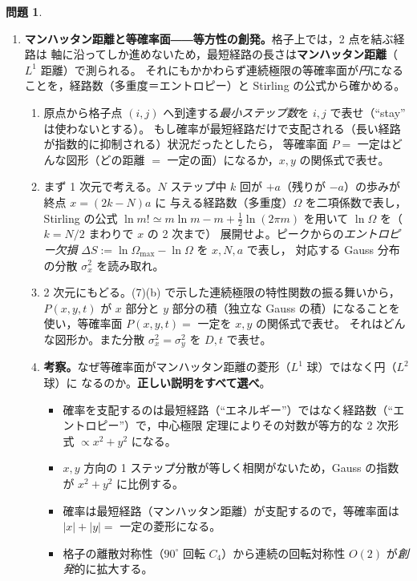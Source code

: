 \documentclass[dvipdfmx, uplatex]{jsarticle}
\theoremstyle{definition}
\newtheorem*{prob}{問題}
\begin{document}
\begin{prob}
\begin{enumerate}[start=8]
\item \textbf{マンハッタン距離と等確率面――等方性の創発。}格子上では，2 点を結ぶ経路は
軸に沿ってしか進めないため，最短経路の長さは\textbf{マンハッタン距離}（$L^1$ 距離）で測られる。
それにもかかわらず連続極限の等確率面が\emph{円}になることを，経路数（多重度＝エントロピー）と
Stirling の公式から確かめる。
\begin{enumerate}
\item 原点から格子点 $(i,j)$ へ到達する\emph{最小ステップ数}を $i,j$ で表せ（``stay'' は使わないとする）。
もし確率が最短経路だけで支配される（長い経路が指数的に抑制される）状況だったとしたら，
等確率面 $P=$ 一定はどんな図形（どの距離 $=$ 一定の面）になるか，$x,y$ の関係式で表せ。
\item まず 1 次元で考える。$N$ ステップ中 $k$ 回が $+a$（残りが $-a$）の歩みが終点 $x=(2k-N)a$ に
与える経路数（多重度）$\Omega$ を二項係数で表し，Stirling の公式
$\ln m!\simeq m\ln m-m+\tfrac12\ln(2\pi m)$ を用いて $\ln\Omega$ を（$k=N/2$ まわりで $x$ の 2 次まで）
展開せよ。ピークからの\emph{エントロピー欠損} $\Delta S:=\ln\Omega_{\max}-\ln\Omega$ を $x,N,a$ で表し，
対応する Gauss 分布の分散 $\sigma_x^2$ を読み取れ。
\item 2 次元にもどる。(7)(b) で示した連続極限の特性関数の振る舞いから，$P(x,y,t)$ が $x$ 部分と
$y$ 部分の積（独立な Gauss の積）になることを使い，等確率面 $P(x,y,t)=$ 一定を $x,y$ の関係式で表せ。
それはどんな図形か。また分散 $\sigma_x^2=\sigma_y^2$ を $D,t$ で表せ。
\item \textbf{考察。}なぜ等確率面がマンハッタン距離の菱形（$L^1$ 球）ではなく円（$L^2$ 球）に
なるのか。\textbf{正しい説明をすべて選べ}。
\begin{itemize}\setlength{\itemsep}{1pt}
\item[(あ)] 確率を支配するのは最短経路（``エネルギー''）ではなく経路数（``エントロピー''）で，中心極限
定理によりその対数が等方的な 2 次形式 $\propto x^2+y^2$ になる。
\item[(い)] $x,y$ 方向の 1 ステップ分散が等しく相関がないため，Gauss の指数が $x^2+y^2$ に比例する。
\item[(う)] 確率は最短経路（マンハッタン距離）が支配するので，等確率面は $|x|+|y|=$ 一定の菱形になる。
\item[(え)] 格子の離散対称性（$90^\circ$ 回転 $C_4$）から連続の回転対称性 $O(2)$ が\emph{創発}的に拡大する。
\end{itemize}
\end{enumerate}
\end{enumerate}
\end{prob}
\end{document}
